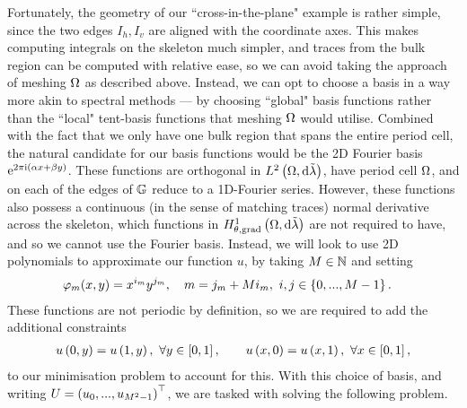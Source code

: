 Fortunately, the geometry of our ``cross-in-the-plane" example is rather simple, since the two edges $I_h, I_v$ are aligned with the coordinate axes.
This makes computing integrals on the skeleton much simpler, and traces from the bulk region can be computed with relative ease, so we can avoid taking the approach of meshing $\Omega$ as described above.
Instead, we can opt to choose a basis in a way more akin to spectral methods --- by choosing ``global" basis functions rather than the ``local" tent-basis functions that meshing $\Omega$ would utilise.
Combined with the fact that we only have one bulk region that spans the entire period cell, the natural candidate for our basis functions would be the 2D Fourier basis $\mathrm{e}^{2\pi\mathrm{i}(\alpha x + \beta y)}$.
These functions are orthogonal in $L^{2}\left( \Omega,\mathrm{d}\tilde{\lambda} \right)$, have period cell $\Omega$, and on each of the edges of $\mathbb{G}$ reduce to a 1D-Fourier series.
However, these functions also possess a continuous (in the sense of matching traces) normal derivative across the skeleton, which functions in $H^1_{\theta, \mathrm{grad}}\left( \Omega, \mathrm{d}\tilde{\lambda} \right)$ are not required to have, and so we cannot use the Fourier basis.
Instead, we will look to use 2D polynomials to approximate our function $u$, by taking $M\in\mathbb{N}$ and setting
\begin{align} \label{eq:2DPolyBasisDef}
	\varphi_m(x,y) &= x^{i_m} y^{j_m}, \quad m = j_m + Mi_m, \ i,j\in\clbracs{0,...,M-1}.
\end{align}
These functions are not periodic by definition, so we are required to add the additional constraints
\begin{align*}
	u\left( 0,y \right) = u\left( 1,y \right), \ \forall y\in\left[ 0,1 \right], 
	\qquad 
	u\left( x,0 \right) = u\left( x,1 \right), \ \forall x\in\left[ 0,1 \right],
\end{align*}
to our minimisation problem to account for this.
With this choice of basis, and writing $U = \left( u_0,...,u_{M^2-1} \right)^\top$, we are tasked with solving the following problem.
